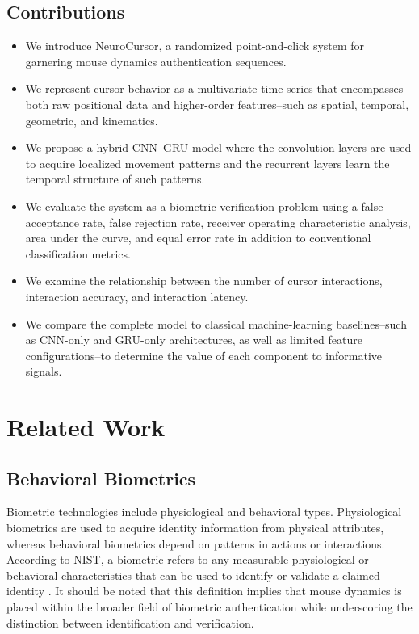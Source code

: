 \documentclass[conference]{IEEEtran}
\begin{document}
\subsection{Contributions}
\begin{itemize}
    \item We introduce NeuroCursor, a randomized point-and-click system for garnering mouse dynamics authentication sequences. 

    \item We represent cursor behavior as a multivariate time series that encompasses both raw positional data and higher-order features--such as spatial, temporal, geometric, and kinematics. 

    \item We propose a hybrid CNN--GRU model where the convolution layers are used to acquire localized movement patterns and the recurrent layers learn the temporal structure of such patterns. 

    \item We evaluate the system as a biometric verification problem using a false acceptance rate, false rejection rate, receiver operating characteristic analysis, area under the curve, and equal error rate in addition to conventional classification metrics. 

    \item We examine the relationship between the number of cursor interactions, interaction accuracy, and interaction latency. 

    \item We compare the complete model to classical machine-learning baselines--such as CNN-only and GRU-only architectures, as well as limited feature configurations--to determine the value of each component to informative signals. 
\end{itemize}

\section{Related Work}
\subsection{Behavioral Biometrics}

Biometric technologies include physiological and behavioral types. Physiological biometrics are used to acquire identity information from physical attributes, whereas behavioral biometrics depend on patterns in actions or interactions. According to NIST, a biometric refers to any measurable physiological or behavioral characteristics that can be used to identify or validate a claimed identity \cite{nistBiometrics}. It should be noted that this definition implies that mouse dynamics is placed within the broader field of biometric authentication while underscoring the distinction between identification and verification. 
\end{document}
